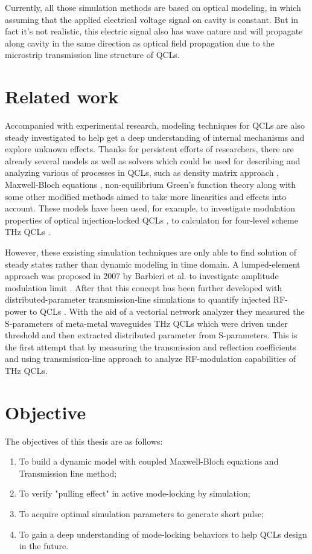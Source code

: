 \documentclass[11pt,final]{scrbook}
\begin{document}
Currently, all those simulation methods are based on optical modeling, in which assuming that the applied electrical voltage signal on cavity is constant. But in fact it's not realistic, this electric signal also has wave nature and will propagate along cavity in the same direction as optical field propagation due to the microstrip transmission line structure of QCLs.
\section{Related work}
Accompanied with experimental research, modeling techniques for QCLs are also steady investigated to help get a deep understanding of internal mechanisms and explore unknown effects. Thanks for persistent efforts of researchers, there are already several models as well as solvers which could be used for describing and analyzing various of processes in QCLs, such as density matrix approach \cite{weber2009density}, Maxwell-Bloch equations \cite{gordon2008multimode}, non-equilibrium Green’s function theory \cite{kubis2008non} along with some other modified methods aimed to take more linearities and effects into account. These models have been used, for example, to investigate modulation properties of optical injection-locked QCLs \cite{wang2013rate}, to calculaton for four-level scheme THz QCLs \cite{yasuda2009nonequilibrium}.

However, these exsisting simulation techniques are only able to find solution of steady states rather than dynamic modeling in time domain. A lumped-element approach was proposed in 2007 by Barbieri et al. to investigate amplitude modulation limit \cite{barbieri200713}. After that this concept has been further developed with distributed-parameter transmission-line simulations to quantify injected RF-power to QCLs \cite{maineult2010microwave}. With the aid of a vectorial network analyzer they measured the S-parameters of meta-metal waveguides THz QCLs which were driven under threshold and then extracted distributed parameter from S-parameters. This is the first attempt that by measuring the transmission and reflection coefficients and using transmission-line approach to analyze RF-modulation capabilities of THz QCLs.

\section{Objective}
The objectives of this thesis are as follows:
\begin{enumerate}
\item To build a dynamic model with coupled Maxwell-Bloch equations and  Transmission line method;
\item To verify "pulling effect" in active mode-locking by simulation;
\item To acquire optimal simulation parameters to generate short pulse;
\item To gain a deep understanding of mode-locking behaviors to help QCLs design in the future.
\end{enumerate}
\end{document}
